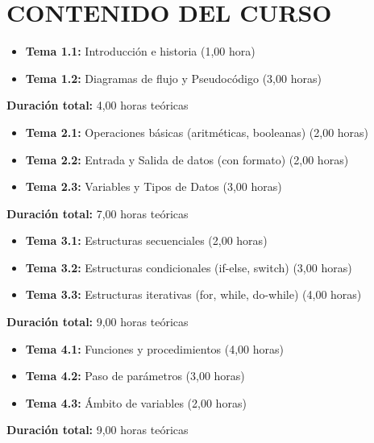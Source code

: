 \documentclass[12pt,a4paper]{article}
\begin{document}
\section{CONTENIDO DEL CURSO}

\begin{tcolorbox}[colback=white,colframe=pucpAzul,title=\textbf{UNIDAD 1: Introducción a la Programación}]
\begin{itemize}[leftmargin=*]
    \item \textbf{Tema 1.1:} Introducción e historia (1,00 hora)
    \item \textbf{Tema 1.2:} Diagramas de flujo y Pseudocódigo (3,00 horas)
\end{itemize}
\textbf{Duración total:} 4,00 horas teóricas
\end{tcolorbox}

\begin{tcolorbox}[colback=white,colframe=pucpAzul,title=\textbf{UNIDAD 2: Conceptos Fundamentales}]
\begin{itemize}[leftmargin=*]
    \item \textbf{Tema 2.1:} Operaciones básicas (aritméticas, booleanas) (2,00 horas)
    \item \textbf{Tema 2.2:} Entrada y Salida de datos (con formato) (2,00 horas)
    \item \textbf{Tema 2.3:} Variables y Tipos de Datos (3,00 horas)
\end{itemize}
\textbf{Duración total:} 7,00 horas teóricas
\end{tcolorbox}

\begin{tcolorbox}[colback=white,colframe=pucpAzul,title=\textbf{UNIDAD 3: Estructuras de Control}]
\begin{itemize}[leftmargin=*]
    \item \textbf{Tema 3.1:} Estructuras secuenciales (2,00 horas)
    \item \textbf{Tema 3.2:} Estructuras condicionales (if-else, switch) (3,00 horas)
    \item \textbf{Tema 3.3:} Estructuras iterativas (for, while, do-while) (4,00 horas)
\end{itemize}
\textbf{Duración total:} 9,00 horas teóricas
\end{tcolorbox}

\begin{tcolorbox}[colback=white,colframe=pucpAzul,title=\textbf{UNIDAD 4: Modularización}]
\begin{itemize}[leftmargin=*]
    \item \textbf{Tema 4.1:} Funciones y procedimientos (4,00 horas)
    \item \textbf{Tema 4.2:} Paso de parámetros (3,00 horas)
    \item \textbf{Tema 4.3:} Ámbito de variables (2,00 horas)
\end{itemize}
\textbf{Duración total:} 9,00 horas teóricas
\end{tcolorbox}
\end{document}
